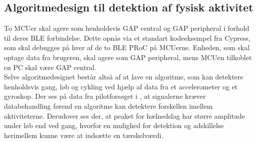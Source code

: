 \subsection{Algoritmedesign til detektion af fysisk aktivitet} \label{krav_algoritme}
To MCUer skal agere som henholdsvis GAP central og GAP peripheral i forhold til deres BLE forbindelse. Dette opnås via et standart kodeeksempel fra Cypress, som skal debugges på hver af de to BLE PRoC på MCUerne. Enheden, som skal optage data fra brugeren, skal agere som GAP peripheral, mens MCUen tilkoblet en PC skal være GAP central. \\
Selve algoritmedesignet består altså af at lave en algoritme, som kan detektere henholdsvis gang, løb og cykling ved hjælp af data fra et accelerometer og et gyroskop. Der ses på data fra pilotforsøget i , at signalerne kræver databehandling førend en algoritme kan detektere forskellen imellem aktiviteterne. Derudover ses der, at peaket for hælnedslag har større amplitude under løb end ved gang, hvorfor en mulighed for detektion og adskillelse herimellem kunne være at indsætte en tærskelværdi.

